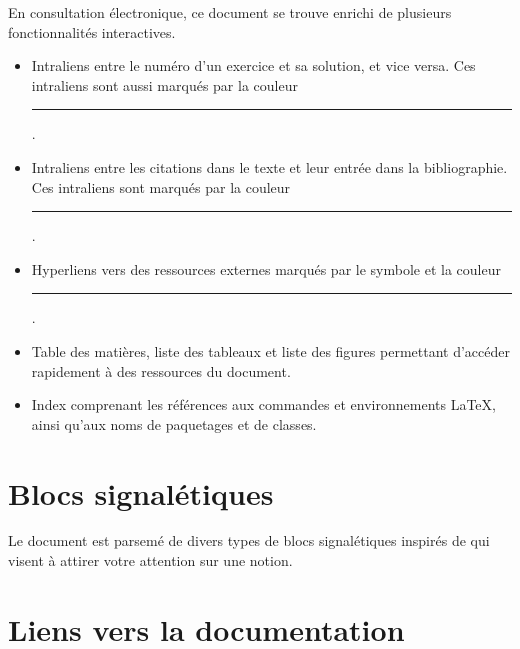 En consultation électronique, ce document se trouve enrichi de
plusieurs fonctionnalités interactives.
\begin{itemize}
\item Intraliens entre le numéro d'un exercice et sa solution, et vice
  versa. Ces intraliens sont aussi marqués par la couleur
  \textcolor{link}{\rule{1.5em}{1.2ex}}.
\item Intraliens entre les citations dans le texte et leur entrée dans
  la bibliographie. Ces intraliens sont marqués par la couleur
  \textcolor{citation}{\rule{1.5em}{1.2ex}}.
\item Hyperliens vers des ressources externes marqués par le symbole
  {\faExternalLink*} et la couleur
  \textcolor{url}{\rule{1.5em}{1.2ex}}.
\item Table des matières, liste des tableaux et liste des figures
  permettant d'accéder rapidement à des ressources du document.
\item Index comprenant les références aux commandes et environnements
  {\LaTeX}, ainsi qu'aux noms de paquetages et de classes.
\end{itemize}

\section*{Blocs signalétiques}

Le document est parsemé de divers types de blocs signalétiques
inspirés de
qui visent à attirer votre attention sur une notion.

\vspace{-\baselineskip}

\vspace{-\baselineskip}

\vspace{-\baselineskip}


\section*{Liens vers la documentation}

